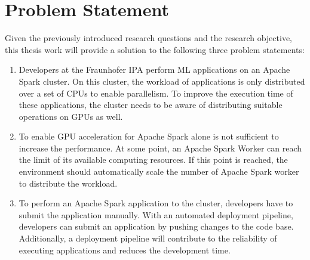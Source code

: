 \section{Problem Statement}
\label{sec:01_introduction_problem}
Given the previously introduced research questions and the research objective, this thesis work will provide a solution to the following three problem statements:

\begin{enumerate}
\item Developers at the Fraunhofer IPA perform ML applications on an Apache Spark cluster.
On this cluster, the workload of applications is only distributed over a set of CPUs to enable parallelism.
To improve the execution time of these applications, the cluster needs to be aware of distributing suitable operations on GPUs as well.

\item To enable GPU acceleration for Apache Spark alone is not sufficient to increase the performance.
At some point, an Apache Spark Worker can reach the limit of its available computing resources.
If this point is reached, the environment should automatically scale the number of Apache Spark worker to distribute the workload.

\item To perform an Apache Spark application to the cluster, developers have to submit the application manually.
With an automated deployment pipeline, developers can submit an application by pushing changes to the code base.
Additionally, a deployment pipeline will contribute to the reliability of executing applications and reduces the development time.
\end{enumerate}


